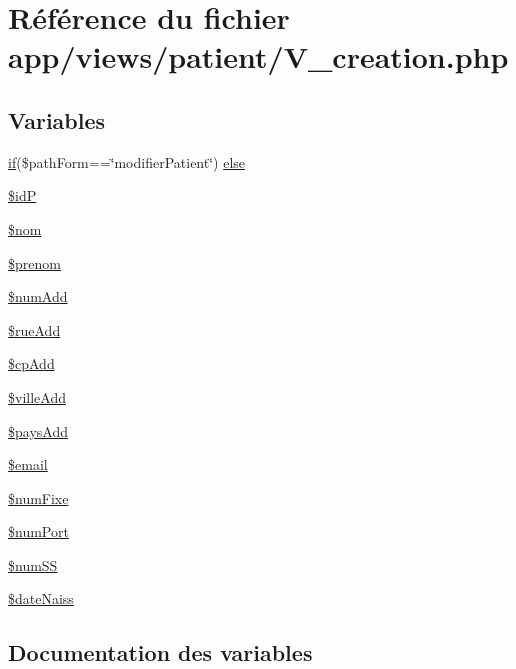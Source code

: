 \hypertarget{_v__creation_8php}{}\section{Référence du fichier app/views/patient/\+V\+\_\+creation.php}
\label{_v__creation_8php}
\subsection*{Variables}
\begin{DoxyCompactItemize}
\item 
\hyperlink{_v__menu_8php_ac81b1d41ce3949361fdb64fac6891d95}{if}(\$path\+Form==\char`\"{}modifier\+Patient\char`\"{}) \hyperlink{_v__creation_8php_a1e483cd2dbe06b75ba1c64a83cc8c0ba}{else}
\item 
\hyperlink{_v__creation_8php_a3f6dcebc335761d6233aa1430ddb161b}{\$idP}
\item 
\hyperlink{_v__creation_8php_ac72f7055f1354a72cd1dcca5d9f1e121}{\$nom}
\item 
\hyperlink{_v__creation_8php_a79561b2ac030de600ace51879093d95c}{\$prenom}
\item 
\hyperlink{_v__creation_8php_a7419fcfe1ec39e5f0f9c49d339eb3cd6}{\$num\+Add}
\item 
\hyperlink{_v__creation_8php_afc5464626d25adb196b08b53971faded}{\$rue\+Add}
\item 
\hyperlink{_v__creation_8php_adf3865adb36bb25c5ac811aa4a8dbd44}{\$cp\+Add}
\item 
\hyperlink{_v__creation_8php_a71724b96b3bdb3d39dd8516473d33544}{\$ville\+Add}
\item 
\hyperlink{_v__creation_8php_a584cefde3b90451340b2eae0deaf5f19}{\$pays\+Add}
\item 
\hyperlink{_v__creation_8php_ad634f418b20382e2802f80532d76d3cd}{\$email}
\item 
\hyperlink{_v__creation_8php_ab3053274e7829e36c0e54155e685d427}{\$num\+Fixe}
\item 
\hyperlink{_v__creation_8php_a644b15531fb82911e96f13b2e564be79}{\$num\+Port}
\item 
\hyperlink{_v__creation_8php_a5c21e8a6576cb53925d2526954f73525}{\$num\+SS}
\item 
\hyperlink{_v__creation_8php_a8134bc7575d48e7828eab1a46e4a7dfc}{\$date\+Naiss}
\end{DoxyCompactItemize}


\subsection{Documentation des variables}
\mbox{\label{_v__creation_8php_adf3865adb36bb25c5ac811aa4a8dbd44}} 

